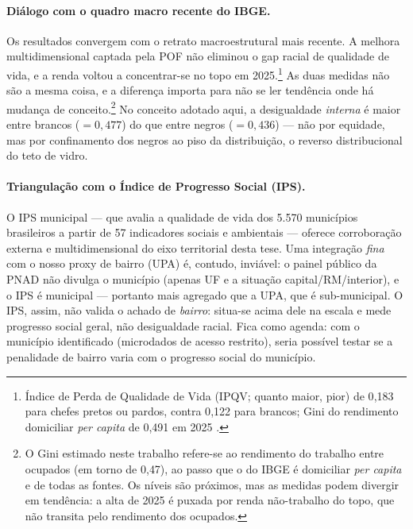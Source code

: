 \documentclass[12pt, a4paper, oneside]{article}
\begin{document}
\paragraph{Diálogo com o quadro macro recente do IBGE.}
Os resultados convergem com o retrato macroestrutural mais recente. A melhora multidimensional captada pela POF não eliminou o gap racial de qualidade de vida, e a renda voltou a concentrar-se no topo em 2025.\footnote{Índice de Perda de Qualidade de Vida (IPQV; quanto maior, pior) de 0{,}183 para chefes pretos ou pardos, contra 0{,}122 para brancos; Gini do rendimento domiciliar \emph{per capita} de 0{,}491 em 2025 \cite{ibge_pof_2019, ibge_rendimentos_2025}.}
As duas medidas não são a mesma coisa, e a diferença importa para não se ler tendência onde há mudança de conceito.\footnote{O Gini estimado neste trabalho refere-se ao rendimento do trabalho entre ocupados (em torno de 0{,}47), ao passo que o do IBGE é domiciliar \emph{per capita} e de todas as fontes. Os níveis são próximos, mas as medidas podem divergir em tendência: a alta de 2025 é puxada por renda não-trabalho do topo, que não transita pelo rendimento dos ocupados.} No conceito adotado aqui, a desigualdade \emph{interna}
é maior entre brancos ($=0,477$) do que entre negros
($=0,436$) --- não por equidade, mas por confinamento dos
negros ao piso da distribuição, o reverso distribucional do teto de vidro.

\paragraph{Triangulação com o Índice de Progresso Social (IPS).}
O IPS municipal \cite{wilm2026} --- que avalia a qualidade de vida dos
5.570 municípios brasileiros a partir de 57 indicadores sociais e ambientais ---
oferece corroboração externa e multidimensional do eixo territorial desta tese.
Uma integração \textit{fina} com o nosso proxy de bairro (UPA) é, contudo,
inviável: o painel público da PNAD não divulga o município (apenas UF e a situação
capital/RM/interior), e o IPS é municipal --- portanto mais agregado que a UPA, que
é sub-municipal. O IPS, assim, não valida o achado de \emph{bairro}: situa-se
acima dele na escala e mede progresso social geral, não desigualdade racial. Fica
como agenda: com o município identificado (microdados de acesso restrito), seria
possível testar se a penalidade de bairro varia com o progresso social do município.
\end{document}
